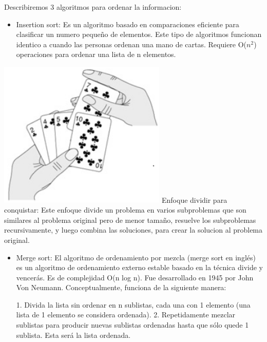 \documentclass[12pt,letterpaper]{article}
\begin{document}
\vskip 0.4cm
Describiremos 3 algoritmos para ordenar la informacion: 
\vskip 0.4cm
\begin{itemize}
\item Insertion sort: Es un algoritmo basado en comparaciones eficiente para clasificar un numero pequeño de elementos. Este tipo de algoritmos funcionan identico a cuando las personas ordenan una mano de cartas. Requiere O($n^2$) operaciones para ordenar una lista de n elementos.
\end{itemize}
\vskip 0.4cm
\includegraphics[width=8cm,height=7cm]{Imagen1}
\vskip 0.4cm
Enfoque dividir para conquistar: Este enfoque divide un problema en varios subproblemas que son similares al problema original pero de menor tamaño, resuelve los subproblemas recursivamente, y luego combina las soluciones, para crear la solucion al problema original.
\vskip 0.4cm
\begin{itemize}
\item Merge sort: El algoritmo de ordenamiento por mezcla (merge sort en inglés) es un algoritmo de ordenamiento externo estable basado en la técnica divide y vencerás. Es de complejidad O(n log n). Fue desarrollado en 1945 por John Von Neumann.
\vskip 0.4cm
Conceptualmente, funciona de la siguiente manera:

1. Divida la lista sin ordenar en n sublistas, cada una con 1 elemento (una lista de 1 elemento se considera ordenada).
\vskip 0.4cm
2. Repetidamente mezclar sublistas para producir nuevas sublistas ordenadas hasta que sólo quede 1 sublista. Esta será la lista ordenada.
\end{itemize}
\vskip 0.4cm
\end{document}
